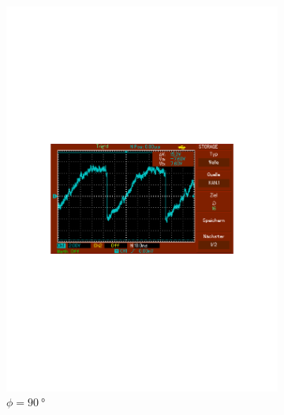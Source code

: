 \begin{figure}
\begin{subfigure}{0.3\textwidth}
      \includegraphics[width=\textwidth]{Daten/Noise/90.pdf}
      \caption{$\phi = \SI{90}{\degree}$}
      \label{fig:90n}
  \end{subfigure}
  \begin{subfigure}{0.3\textwidth}
      \centering

\end{subfigure}
\end{figure}
